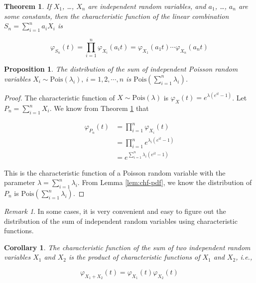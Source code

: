 \documentclass[
  12pt,
]{krantz}
\newtheorem{theorem}{Theorem}[chapter]
\newtheorem{corollary}{Corollary}[chapter]
\newtheorem{proposition}{Proposition}[chapter]
\theoremstyle{definition}
\theoremstyle{definition}
\theoremstyle{definition}
\theoremstyle{definition}
\theoremstyle{remark}
\newtheorem*{remark}{Remark}
\begin{document}
\begin{theorem}
\protect\hypertarget{thm:chf-sum}{}\label{thm:chf-sum}If \(X_1\), \ldots, \(X_n\) are independent random variables, and \(a_1\), \ldots, \(a_n\) are some constants, then the characteristic function of the linear combination \(S_n=\sum_{i=1}^na_iX_i\) is

\[\varphi _{S_{n}}(t)=\prod_{i=1}^n\varphi _{X_i}(a_{i}t)=\varphi _{X_{1}}(a_{1}t)\cdots \varphi _{X_{n}}(a_{n}t)\]
\end{theorem}

\begin{proposition}
The distribution of the sum of independent Poisson random variables \(X_i \sim \mathrm{Pois}(\lambda_i),\: i=1,2,\cdots,n\) is \(\mathrm{Pois}(\sum_{i=1}^n\lambda_i)\).
\end{proposition}

\begin{proof}
The characteristic function of \(X\sim\mathrm{Pois}(\lambda)\) is \(\varphi _{X}(t)=e^{\lambda (e^{it}-1)}\). Let \(P_n=\sum_{i=1}^nX_i\). We know from Theorem \ref{thm:chf-sum} that

\begin{equation*}
\begin{split}
\varphi _{P_{n}}(t) & =\prod_{i=1}^n\varphi _{X_i}(t) \\
& =\prod_{i=1}^n e^{\lambda_i (e^{it}-1)} \\
& = e^{\sum_{i=1}^n \lambda_i (e^{it}-1)}
\end{split}
\end{equation*}

This is the characteristic function of a Poisson random variable with the parameter \(\lambda=\sum_{i=1}^n \lambda_i\). From Lemma \ref{lem:chf-pdf}, we know the distribution of \(P_n\) is \(\mathrm{Pois}(\sum_{i=1}^n\lambda_i)\).
\end{proof}

\begin{remark}
In some cases, it is very convenient and easy to figure out the distribution of the sum of independent random variables using characteristic functions.
\end{remark}

\begin{corollary}
The characteristic function of the sum of two independent random variables \(X_1\) and \(X_2\) is the product of characteristic functions of \(X_1\) and \(X_2\), i.e.,

\[\varphi _{X_1+X_2}(t)=\varphi _{X_1}(t) \varphi _{X_2}(t)\]
\end{corollary}
\end{document}
